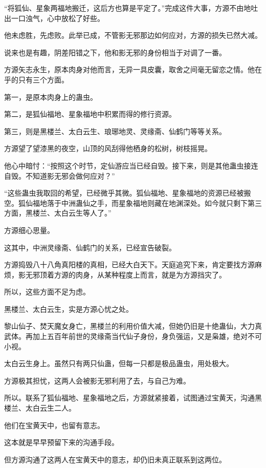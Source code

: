 
\begin{this_body}

“将狐仙、星象两福地搬迁，这后方也算是平定了。”完成这件大事，方源不由地吐出一口浊气，心中放松了好些。

他未虑胜，先虑败。此举已成，不管影无邪那边如何应对，方源的损失已然大减。

说来也是有趣，阴差阳错之下，他和影无邪的身份相当于对调了一番。

方源矢志永生，原本肉身对他而言，无异一具皮囊，取舍之间毫无留恋之情。他在乎的只有三个方面。

第一，是原本肉身上的蛊虫。

第二，是狐仙福地、星象福地中积累而得的修行资源。

第三，则是黑楼兰、太白云生、琅琊地灵、灵缘斋、仙鹤门等等关系。

方源望了望漆黑的夜空，山顶的风刮得他栖身的松树，树枝摇晃。

他心中暗忖：“按照这个时节，定仙游应当已经自毁。接下来，则是其他蛊虫接连自毁。不知道影无邪会做何应对？”

“这些蛊虫我取回的希望，已经微乎其微。狐仙福地、星象福地的资源已经被搬空。狐仙福地落于中洲蛊仙之手，而星象福地则藏在地渊深处。如今就只剩下第三方面，黑楼兰、太白云生等人了。”

方源细心思量。

这其中，中洲灵缘斋、仙鹤门的关系，已经宣告破裂。

方源捣毁八十八角真阳楼的真相，已经大白天下。天庭追究下来，肯定要找方源麻烦，影无邪顶着方源的肉身，从某种程度上而言，就是为方源挡灾了。

所以，这些方面不足为虑。

黑楼兰、太白云生，实是方源心忧之处。

黎山仙子、焚天魔女身亡，黑楼兰的利用价值大减，但她仍旧是十绝蛊仙，大力真武体。再加上五百年前世的灵缘斋当代仙子身份，身负强运，又是枭雄，绝对不可小视。

太白云生身上。虽然只有两只仙蛊，但每一只都是极品蛊虫，用处极大。

方源极其担忧，这两人会被影无邪利用了去，与自己为难。

所以。联系了狐仙福地、星象福地之后，方源就紧接着，试图通过宝黄天，沟通黑楼兰、太白云生二人。

他们在宝黄天中，也留有意志。

这本就是早早预留下来的沟通手段。

但方源沟通了这两人在宝黄天中的意志，却仍旧未真正联系到这两位。


\end{this_body}
